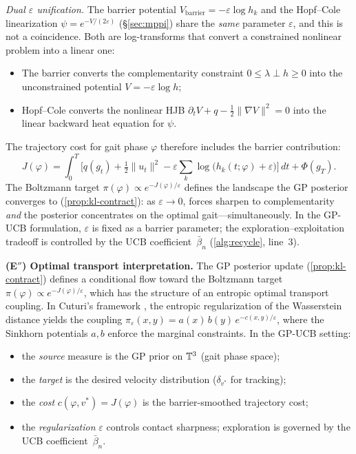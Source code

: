 \medskip\noindent\emph{Dual $\varepsilon$ unification.}
The barrier potential $V_{\mathrm{barrier}} = -\varepsilon\log h_k$ and the
Hopf--Cole linearization $\psi = e^{-V/(2\varepsilon)}$ (\S\ref{sec:mppi})
share the \emph{same} parameter $\varepsilon$, and this is not a coincidence.
Both are log-transforms that convert a constrained nonlinear problem into a
linear one:
\begin{itemize}[nosep]
\item The barrier converts the complementarity constraint
  $0 \leq \lambda \perp h \geq 0$ into the unconstrained potential
  $V = -\varepsilon\log h$;
\item Hopf--Cole converts the nonlinear HJB
  $\partial_t V + q - \tfrac{1}{2}\|\nabla V\|^2 = 0$ into the linear
  backward heat equation for $\psi$.
\end{itemize}
The trajectory cost for gait phase $\varphi$ therefore includes
the barrier contribution:
\[
J(\varphi) = \int_0^T \!\bigl[
  q(g_t) + \tfrac{1}{2}\|u_t\|^2
  - \varepsilon\textstyle\sum_k \log\bigl(h_k(t;\varphi) + \varepsilon\bigr)
\bigr]\,dt + \Phi(g_T).
\]
The Boltzmann target $\pi(\varphi) \propto e^{-J(\varphi)/\varepsilon}$
defines the landscape the GP posterior converges to
(\cref{prop:kl-contract}): as $\varepsilon \to 0$,
forces sharpen to complementarity \emph{and} the posterior
concentrates on the optimal gait---simultaneously.
In the GP-UCB formulation, $\varepsilon$ is fixed as a barrier parameter;
the exploration--exploitation tradeoff is controlled by the UCB
coefficient~$\bar\beta_n$ (\cref{alg:recycle}, line~3).

\medskip\noindent\textbf{(E$''$) Optimal transport interpretation.}
The GP posterior update (\cref{prop:kl-contract}) defines a
conditional flow toward the Boltzmann target
$\pi(\varphi) \propto e^{-J(\varphi)/\varepsilon}$,
which has the structure of an entropic optimal transport coupling.
In Cuturi's framework \cite{Cuturi2013}, the entropic regularization of the
Wasserstein distance yields the coupling
$\pi_\varepsilon(x,y) = a(x)\,b(y)\,e^{-c(x,y)/\varepsilon}$,
where the Sinkhorn potentials $a, b$ enforce the marginal constraints.
In the GP-UCB setting:
\begin{itemize}[nosep]
\item the \emph{source} measure is the GP prior on $\mathbb{T}^3$
  (gait phase space);
\item the \emph{target} is the desired velocity distribution
  ($\delta_{v^*}$ for tracking);
\item the \emph{cost} $c(\varphi, v^*) = J(\varphi)$ is the
  barrier-smoothed trajectory cost;
\item the \emph{regularization} $\varepsilon$ controls contact sharpness;
  exploration is governed by the UCB coefficient~$\bar\beta_n$.
\end{itemize}

